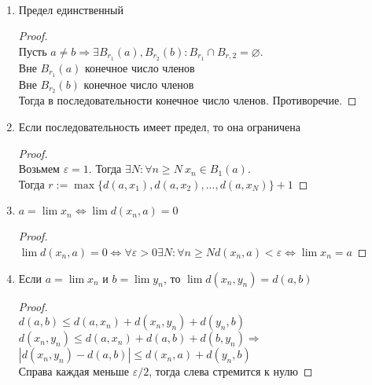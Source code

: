     \begin{theorem-non}
        \quad \\
        \begin{enumerate}
            \item Предел единственный
            \begin{proof}
                \quad \\
                Пусть $a\neq b \Longrightarrow \exists B_{r_1}(a), B_{r_2}(b) : B_{r_1} \cap B_{r, 2} = \varnothing$. \\
                Вне $B_{r_1}(a)$ конечное число членов \\
                Вне $B_{r_2}(b)$ конечное число членов \\
                Тогда в последовательности конечное число членов. Противоречие.
            \end{proof}
            \item Если последовательность имеет предел, то она ограничена
            \begin{proof}
                \quad \\
                Возьмем $\varepsilon=1$. Тогда $\exists N: \forall n\geqslant N\ x_n \in B_1(a)$. \\
                Тогда $r:= \max\{d(a, x_1), d(a, x_2),..., d(a, x_N)\}+1$
            \end{proof}
            \item $a=\lim x_n \Longleftrightarrow \lim d(x_n, a)=0$
            \begin{proof}
                \quad \\
                $\lim d(x_n, a)=0 \Longleftrightarrow \forall \varepsilon > 0 \exists N : \forall n \geqslant N d(x_n, a) < \varepsilon \Longleftrightarrow \lim x_n = a$
            \end{proof}
            \item Если $a=\lim x_n$ и $b = \lim y_n$, то $\lim d(x_n, y_n) = d(a, b)$
            \begin{proof}
                \quad \\
                $d(a, b) \leqslant d(a, x_n)+d(x_n, y_n)+d(y_n, b)$
                $d(x_n, y_n) \leqslant d(a, x_n)+d(a, b)+d(b, y_n) \Longrightarrow$
                $|d(x_n, y_n)-d(a, b)|\leqslant d(x_n, a)+d(y_n, b)$ \\
                Справа каждая меньше $\varepsilon /2$, тогда слева стремится к нулю
            \end{proof}
        \end{enumerate}
    \end{theorem-non}